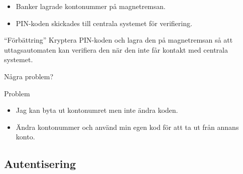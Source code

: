 \begin{frame}
  \begin{example}
    \begin{itemize}
      \item Banker lagrade kontonummer på magnetremsan.
      \item PIN-koden skickades till centrala systemet för verifiering.
    \end{itemize}
  \end{example}

  \pause{}

  \begin{alertblock}{\enquote{Förbättring}}
    Kryptera PIN-koden och lagra den på magnetremsan så att uttagsautomaten kan 
    verifiera den när den inte får kontakt med centrala systemet.
  \end{alertblock}

  \pause{}

  \begin{exercise}
    Några problem?
  \end{exercise}
\end{frame}

\begin{frame}
  \begin{alertblock}{Problem}
    \begin{itemize}
      \item Jag kan byta ut kontonumret men inte ändra koden.
      \item Ändra kontonummer och använd min egen kod för att ta ut från annans 
        konto.
    \end{itemize}
  \end{alertblock}
\end{frame}

\subsection{Autentisering}

